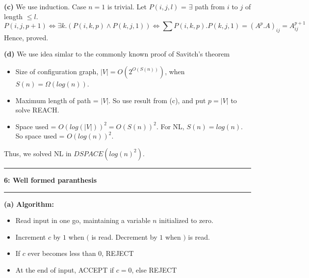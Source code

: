 \documentclass[11pt]{article}
\newcommand\question[2]{\vspace{.25in}\hrule\textbf{#1: #2}\vspace{.5em}\hrule\vspace{.10in}}
\renewcommand\part[1]{\vspace{.10in}\textbf{(#1)}}
\newcommand\algorithm{\vspace{.10in}\textbf{Algorithm: }}
\begin{document}
\part{c} We use induction. Case $n=1$ is trivial. 
Let $P(i,j, l)$ = $\exists$ path from $i$ to $j$ of length $\leq l$.\\
\vspace{-0.20in}
$$P(i, j, p+1) \iff \exists k . (P(i, k, p) \land P(k, j, 1)) \iff \sum{}{}P(i, k, p).P(k, j, 1) = ({A^{p}.A})_{ij} = A^{p+1}_{ij}$$
Hence, proved.

\part{d} 
We use idea simlar to the commonly known proof of Savitch's theorem
\vspace{-0.10in}
\begin{itemize}
\setlength\itemsep{0.01in}
\item Size of configuration graph, $|V| = O(2^{O(S(n))})$, when $S(n) = \Omega(log(n))$.\\
\item Maximum length of path = $|V|$. So use result from (c), and put $p=|V|$ to solve REACH.
\item Space used =  $O(log(|V|))^{2} = O(S(n))^{2}$. For NL, $S(n) = log(n)$. So space used
= $O(log(n))^{2}$.
\end{itemize}
\vspace{-0.10in}
Thus, we solved NL in $DSPACE(log(n)^{2})$.

\newpage
\question{6}{Well formed paranthesis}
\part{a} 
\algorithm
\vspace{-0.15in}
\begin{itemize}
\item Read input in one go, maintaining a variable $n$ initialized to zero. \\
\item Increment $c$ by $1$ when $($ is read. Decrement by $1$ when $)$ is read.\\
\item If $c$ ever becomes less than $0$, REJECT\\
\item At the end of input, ACCEPT if $c=0$, else REJECT 
\end{itemize}
\end{document}
